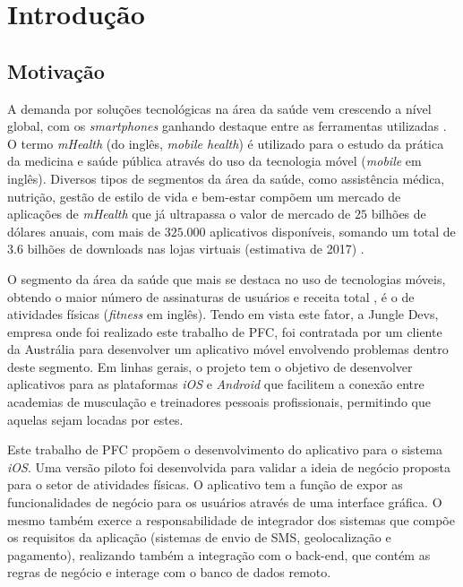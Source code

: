 \chapter{Introdução} \label{cap:intro}
\section{Motivação}
A demanda por soluções tecnológicas na área da saúde vem crescendo a nível global, com os  \textit{smartphones} ganhando destaque entre as ferramentas utilizadas \cite{mhealth-who}. O termo \textit{mHealth} (do inglês, \textit{mobile health}) é utilizado para o estudo da prática da medicina e saúde pública através do uso da tecnologia móvel (\textit{mobile} em inglês). Diversos tipos de segmentos da área da saúde, como assistência médica, nutrição, gestão de estilo de vida e bem-estar compõem um mercado de aplicações de \textit{mHealth} que já ultrapassa o valor de mercado de $25$ bilhões de dólares anuais, com mais de $325.000$ aplicativos disponíveis, somando um total de $3.6$ bilhões de downloads nas lojas virtuais (estimativa de 2017) \cite{mhealth-economics}.

O segmento da área da saúde que mais se destaca no uso de tecnologias móveis, obtendo o maior número de assinaturas de usuários e receita total \cite{mhealth-market}, é o de atividades físicas (\textit{fitness} em inglês). Tendo em vista este fator, a Jungle Devs, empresa onde foi realizado este trabalho de PFC, foi contratada por um cliente da Austrália para desenvolver um aplicativo móvel envolvendo problemas dentro deste segmento. Em linhas gerais, o projeto tem o objetivo de desenvolver aplicativos para as plataformas \textit{iOS} e \textit{Android} que facilitem a conexão entre academias de musculação e treinadores pessoais profissionais, permitindo que aquelas sejam locadas por estes.

Este trabalho de PFC propõem o desenvolvimento do aplicativo para o sistema \textit{iOS}. Uma versão piloto foi desenvolvida para validar a ideia de negócio proposta para o setor de atividades físicas. O aplicativo tem a função de expor as funcionalidades de negócio para os usuários através de uma interface gráfica. O mesmo também exerce a responsabilidade de integrador dos sistemas que compõe os requisitos da aplicação (sistemas de envio de SMS, geolocalização e pagamento), realizando também a integração com o back-end, que contém as regras de negócio e interage com o banco de dados remoto.

